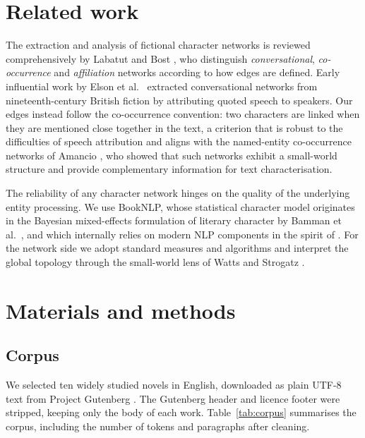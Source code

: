 \documentclass[preprint,12pt]{elsarticle}
\begin{document}
\section{Related work}
\label{sec:related}

The extraction and analysis of fictional character networks is reviewed
comprehensively by Labatut and Bost \cite{labatut2019survey}, who distinguish
\emph{conversational}, \emph{co-occurrence} and \emph{affiliation} networks
according to how edges are defined. Early influential work by Elson et
al.\ \cite{elson2010social} extracted conversational networks from
nineteenth-century British fiction by attributing quoted speech to speakers. Our
edges instead follow the co-occurrence convention: two characters are linked when
they are mentioned close together in the text, a criterion that is robust to the
difficulties of speech attribution and aligns with the named-entity
co-occurrence networks of Amancio \cite{amancio2016entity}, who showed that such
networks exhibit a small-world structure and provide complementary information
for text characterisation.

The reliability of any character network hinges on the quality of the underlying
entity processing. We use BookNLP, whose statistical character model originates
in the Bayesian mixed-effects formulation of literary character by Bamman et
al.\ \cite{bamman2014character}, and which internally relies on modern NLP
components in the spirit of \cite{honnibal2017spacy}. For the network side we
adopt standard measures and algorithms \cite{freeman1977betweenness,
brandes2001betweenness,newman2010networks} and interpret the global topology
through the small-world lens of Watts and Strogatz \cite{watts1998smallworld}.

\section{Materials and methods}
\label{sec:methods}

\subsection{Corpus}
We selected ten widely studied novels in English, downloaded as plain UTF-8 text
from Project Gutenberg \cite{gutenberg}. The Gutenberg header and licence footer
were stripped, keeping only the body of each work. Table~\ref{tab:corpus}
summarises the corpus, including the number of tokens and paragraphs after
cleaning.
\end{document}
